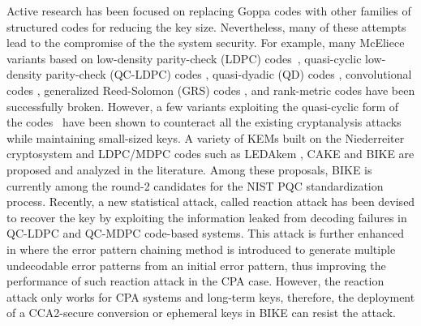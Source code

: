 \documentclass[runningheads]{llncs}
\begin{document}
Active research has been focused on replacing Goppa codes
with other families of structured codes for reducing the key size.
Nevertheless, many of these attempts lead to the compromise of the the system security.
For example, many McEliece variants based on low-density parity-check (LDPC) codes~\cite{monico2000using},
quasi-cyclic low-density parity-check (QC-LDPC) codes \cite{otmani2010cryptanalysis},
quasi-dyadic (QD) codes \cite{misoczki2009compact},
convolutional codes \cite{londahl2012new}, generalized Reed-Solomon (GRS) codes \cite{baldi2016enhanced}, and rank-metric codes \cite{loidreau2017new,gaborit2018polynomial}
have been successfully broken.
However, a few variants exploiting the quasi-cyclic form of the codes~\cite{baldi2013optimization,baldi2008new,misoczki2013mdpc} have been shown to counteract
all the existing cryptanalysis attacks while maintaining small-sized keys.
A variety of KEMs built on the Niederreiter cryptosystem and LDPC/MDPC codes
such as LEDAkem \cite{baldi2018ledakem}, CAKE \cite{barreto2017cake} and BIKE \cite{aragon2017bike}
are proposed and analyzed in the literature.
Among these proposals, BIKE is currently
among the round-2 candidates for the NIST PQC standardization process.
Recently, a new statistical attack, called reaction attack \cite{fabvsivc2017reaction,guo2016key}
has been devised to recover the key by exploiting the information leaked from decoding failures in QC-LDPC and QC-MDPC code-based systems.
This attack is further enhanced in \cite{nilsson2019error} where the error pattern chaining method
is introduced to generate multiple undecodable error patterns from an initial error pattern,
thus improving the performance of such reaction attack in the CPA case.
However, the reaction attack only works for CPA systems and long-term keys, therefore,
the deployment of a CCA2-secure conversion or ephemeral keys in BIKE
can resist the attack.
\end{document}
